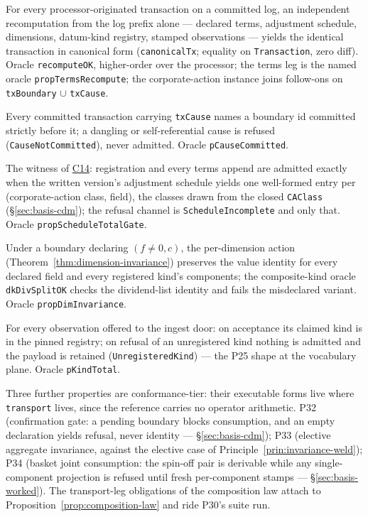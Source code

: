 \begin{description}[leftmargin=3.2em,style=nextline]
\item[P27 Producer agreement]\label{inv:P27} For every processor-originated transaction on a committed log, an independent recomputation from the log prefix alone --- declared terms, adjustment schedule, dimensions, datum-kind registry, stamped observations --- yields the identical transaction in canonical form (\texttt{canonicalTx}; equality on \texttt{Transaction}, zero diff). Oracle \texttt{recomputeOK}, higher-order over the processor; the terms leg is the named oracle \texttt{propTermsRecompute}; the corporate-action instance joins follow-ons on \texttt{txBoundary} $\cup$ \texttt{txCause}.
\item[P28 Cause committed]\label{inv:P28} Every committed transaction carrying \texttt{txCause} names a boundary id committed strictly before it; a dangling or self-referential cause is refused (\texttt{CauseNotCommitted}), never admitted. Oracle \texttt{pCauseCommitted}.
\item[P29 Schedule totality]\label{inv:P29} The witness of \hyperref[cond:C14]{C14}: registration and every terms append are admitted exactly when the written version's adjustment schedule yields one well-formed entry per (corporate-action class, field), the classes drawn from the closed \texttt{CAClass} (\S\ref{sec:basis-cdm}); the refusal channel is \texttt{ScheduleIncomplete} and only that. Oracle \texttt{propScheduleTotalGate}.
\item[P30 Dimension invariance]\label{inv:P30} Under a boundary declaring $(f\neq0,c)$, the per-dimension action (Theorem~\ref{thm:dimension-invariance}) preserves the value identity for every declared field and every registered kind's components; the composite-kind oracle \texttt{dkDivSplitOK} checks the dividend-list identity and fails the misdeclared variant. Oracle \texttt{propDimInvariance}.
\item[P31 Kind totality]\label{inv:P31} For every observation offered to the ingest door: on acceptance its claimed kind is in the pinned registry; on refusal of an unregistered kind nothing is admitted and the payload is retained (\texttt{UnregisteredKind}) --- the P25 shape at the vocabulary plane. Oracle \texttt{pKindTotal}.
\end{description}

\noindent Three further properties are conformance-tier: their executable forms live where \texttt{transport} lives, since the reference carries no operator arithmetic. P32 (confirmation gate: a pending boundary blocks consumption, and an empty declaration yields refusal, never identity --- \S\ref{sec:basis-cdm}); P33 (elective aggregate invariance, against the elective case of Principle~\ref{prin:invariance-weld}); P34 (basket joint consumption: the spin-off pair is derivable while any single-component projection is refused until fresh per-component stamps --- \S\ref{sec:basis-worked}). The transport-leg obligations of the composition law attach to Proposition~\ref{prop:composition-law} and ride P30's suite run.

